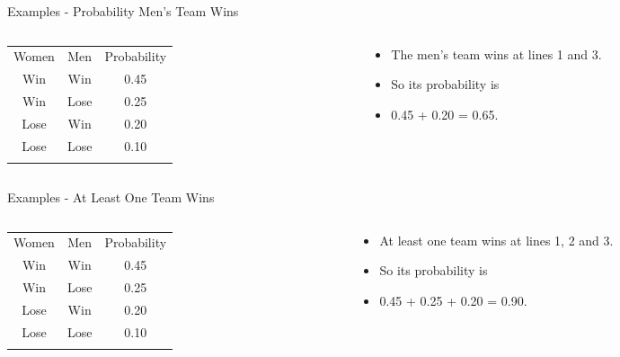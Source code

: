\documentclass[
  ignorenonframetext,
]{beamer}
\providecommand{\tightlist}{%
  \setlength{\itemsep}{0pt}\setlength{\parskip}{0pt}}
\renewcommand{\,}{\text{, }}
\begin{document}
\begin{frame}{Examples - Probability Men's Team Wins}
\protect\hypertarget{examples---probability-mens-team-wins}{}
\begin{columns}[T]
\begin{column}{0.48\textwidth}
\begin{longtable}[]{@{}ccc@{}}
\toprule
Women & Men & Probability \\ \addlinespace
\midrule
\endhead
Win & Win & 0.45 \\ \addlinespace
Win & Lose & 0.25 \\ \addlinespace
Lose & Win & 0.20 \\ \addlinespace
Lose & Lose & 0.10 \\ \addlinespace
\bottomrule
\end{longtable}
\end{column}

\begin{column}{0.48\textwidth}
\bigskip

\begin{itemize}
\tightlist
\item
  The men's team wins at lines 1 and 3.
\item
  So its probability is
\item
  0.45 + 0.20 = 0.65.
\end{itemize}
\end{column}
\end{columns}
\end{frame}

\begin{frame}{Examples - At Least One Team Wins}
\protect\hypertarget{examples---at-least-one-team-wins}{}
\begin{columns}[T]
\begin{column}{0.48\textwidth}
\begin{longtable}[]{@{}ccc@{}}
\toprule
Women & Men & Probability \\ \addlinespace
\midrule
\endhead
Win & Win & 0.45 \\ \addlinespace
Win & Lose & 0.25 \\ \addlinespace
Lose & Win & 0.20 \\ \addlinespace
Lose & Lose & 0.10 \\ \addlinespace
\bottomrule
\end{longtable}
\end{column}

\begin{column}{0.48\textwidth}
\bigskip

\begin{itemize}
\tightlist
\item
  At least one team wins at lines 1, 2 and 3.
\item
  So its probability is
\item
  0.45 + 0.25 + 0.20 = 0.90.
\end{itemize}
\end{column}
\end{columns}
\end{frame}
\end{document}
